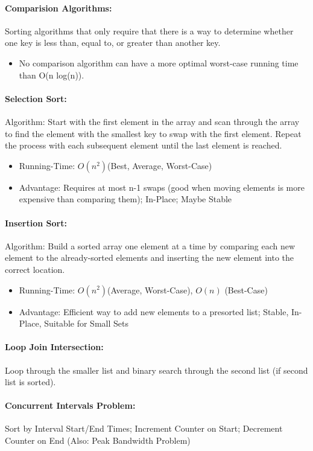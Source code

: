 \documentclass[12pt]{article}
\begin{document}
\paragraph{Comparision Algorithms:} Sorting algorithms that only require that there is a way to determine whether one key is less than, equal to, or greater than another key.
\begin{itemize}
	\item No comparison algorithm can have a more optimal worst-case running time than O(n log(n)).
\end{itemize}

\paragraph{Selection Sort:}
Algorithm: Start with the first element in the array and scan through the array to find the element with the smallest key to swap with the first element. Repeat the process with each subsequent element until the last element is reached.
\begin{itemize}
	\item Running-Time: \(O(n^2) \)(Best, Average, Worst-Case)
	\item Advantage: Requires at most n-1 swaps (good when moving elements is more expensive than comparing them); In-Place; Maybe Stable
\end{itemize}

\paragraph{Insertion Sort:}
Algorithm: Build a sorted array one element at a time by comparing each new element to the already-sorted elements and inserting the new element into the correct location.
\begin{itemize}
	\item Running-Time: \(O(n^2) \)(Average, Worst-Case), \(O(n) \) (Best-Case)
	\item Advantage: Efficient way to add new elements to a presorted list; Stable, In-Place, Suitable for Small Sets
\end{itemize}


\paragraph{Loop Join Intersection:} Loop through the smaller list and binary search through the second list (if second list is sorted).

\paragraph{Concurrent Intervals Problem:} Sort by Interval Start/End Times; Increment Counter on Start; Decrement Counter on End (Also: Peak Bandwidth Problem)



\end{document}
